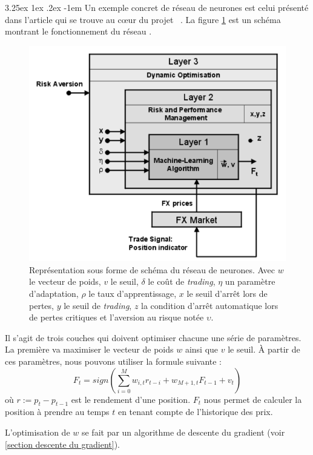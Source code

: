 \documentclass[a4paper, 11pt]{article}
\makeatletter
\renewcommand\paragraph{\@startsection{paragraph}{5}{\z@}%
  {3.25ex \@plus1ex \@minus.2ex}%
  {-1em}%
  {\normalfont\normalsize\bfseries}}
\makeatother
\begin{document}
\paragraph{}
Un exemple concret de réseau de neurones est celui présenté dans l'article qui se trouve au cœur du projet ~\cite{fx_trading}.
La figure \ref{exemple_nn_projet} est un schéma montrant le fonctionnement du réseau \cite{fx_trading}.
\begin{figure}[H]
 \centering
 \includegraphics[scale=0.4]{images/exemple_nn_projet}
 \caption{Représentation sous forme de schéma du réseau de neurones. Avec $w$ le vecteur de poids, $v$ le seuil, $\delta$ le coût de
 \textit{trading}, $\eta$ un paramètre d'adaptation, $\rho$ le taux d'apprentissage, $x$ le seuil d'arrêt lors de pertes, $y$ le
 seuil de \textit{trading}, $z$ la condition d'arrêt automatique lors de pertes critiques et l'aversion au risque notée $\upsilon$.}
\label{exemple_nn_projet}
\end{figure}

Il s'agit de trois couches qui doivent optimiser chacune une série de paramètres. La première va maximiser le vecteur de poids $w$
ainsi que $v$ le seuil. À partir de ces paramètres, nous pouvons utiliser la formule suivante :
$$F_t = sign(\sum_{i=0}^M w_{i,t} r_{t-i} + w_{M+1,t} F_{t-1} + v_t)$$
où $r := p_t - p_{t-1}$ est le rendement d'une position. $F_t$ nous permet de calculer la position à prendre au temps $t$ en tenant
compte de l'historique des prix.

L'optimisation de $w$ se fait par un algorithme de descente du gradient (voir \ref{section descente du gradient}).
\end{document}
